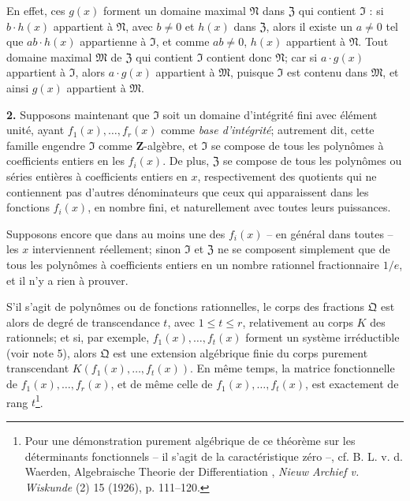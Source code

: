 En effet, ces $g(x)$ forment un domaine maximal $\mathfrak{N}$ dans $\mathfrak{Z}$ qui contient $\mathfrak{I}$ : si $b\cdot h(x)$ appartient à $\mathfrak{N}$, avec $b\ne0$ et $h(x)$ dans $\mathfrak{Z}$, alors il existe un $a\ne0$ tel que $ab\cdot h(x)$ appartienne à $\mathfrak{I}$, et comme $ab\ne0$, $h(x)$ appartient à $\mathfrak{N}$. Tout domaine maximal $\mathfrak{M}$ de $\mathfrak{Z}$ qui contient $\mathfrak{I}$ contient donc $\mathfrak{N}$; car si $a\cdot g(x)$ appartient à $\mathfrak{I}$, alors $a\cdot g(x)$ appartient à $\mathfrak{M}$, puisque $\mathfrak{I}$ est contenu dans $\mathfrak{M}$, et ainsi $g(x)$ appartient à $\mathfrak{M}$.

\medskip
\noindent\textbf{2.}
Supposons maintenant que $\mathfrak{I}$ soit un domaine d'intégrité fini avec élément unité, ayant $f_1(x),\ldots,f_r(x)$ comme \emph{base d'intégrité}; autrement dit, cette famille engendre $\mathfrak{I}$ comme $\mathbf Z$-algèbre, et $\mathfrak{I}$ se compose de tous les polynômes à coefficients entiers en les $f_i(x)$. De plus, $\mathfrak{Z}$ se compose de tous les polynômes ou séries entières à coefficients entiers en $x$, respectivement des quotients qui ne contiennent pas d'autres dénominateurs que ceux qui apparaissent dans les fonctions $f_i(x)$, en nombre fini, et naturellement avec toutes leurs puissances.

Supposons encore que dans au moins une des $f_i(x)$ -- en général dans toutes -- les $x$ interviennent réellement; sinon $\mathfrak{I}$ et $\mathfrak{Z}$ ne se composent simplement que de tous les polynômes à coefficients entiers en un nombre rationnel fractionnaire $1/e$, et il n'y a rien à prouver.

S'il s'agit de polynômes ou de fonctions rationnelles, le corps des fractions $\mathfrak{Q}$ est alors de degré de transcendance $t$, avec $1\leq t\leq r$, relativement au corps $K$ des rationnels; et si, par exemple, $f_1(x),\ldots,f_t(x)$ forment un système irréductible (voir note 5), alors $\mathfrak{Q}$ est une extension algébrique finie du corps purement transcendant $K(f_1(x),\ldots,f_t(x))$. En même temps, la matrice fonctionnelle de $f_1(x),\ldots,f_r(x)$, et de même celle de $f_1(x),\ldots,f_t(x)$, est exactement de rang $t$\footnote{Pour une démonstration purement algébrique de ce théorème sur les déterminants fonctionnels -- il s'agit de la caractéristique zéro --, cf. B. L. v. d. Waerden, \og{} Algebraische Theorie der Differentiation \fg{}, \emph{Nieuw Archief v. Wiskunde} (2) 15 (1926), p. 111--120.}.

